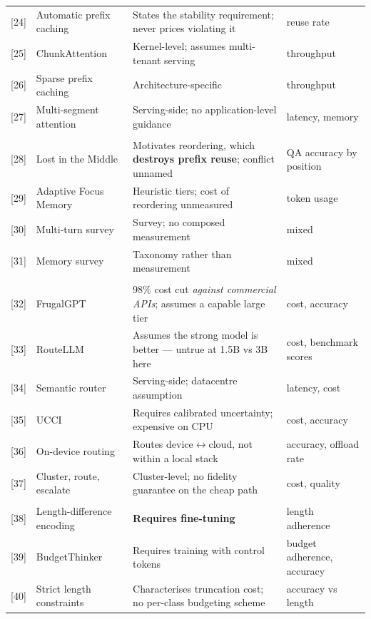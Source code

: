 \documentclass[11pt,a4paper]{article}
\begin{document}
\begin{table}[htbp]
\begin{tabularx}{\textwidth}{@{}l L{3.0cm} X l@{}}
{[24]} & Automatic prefix caching & States the stability requirement; never prices violating it & reuse rate \\
{[25]} & ChunkAttention & Kernel-level; assumes multi-tenant serving & throughput \\
{[26]} & Sparse prefix caching & Architecture-specific & throughput \\
{[27]} & Multi-segment attention & Serving-side; no application-level guidance & latency, memory \\
\addlinespace
{}\\
{[28]} & Lost in the Middle & Motivates reordering, which \textbf{destroys prefix reuse}; conflict unnamed & QA accuracy by position \\
{[29]} & Adaptive Focus Memory & Heuristic tiers; cost of reordering unmeasured & token usage \\
{[30]} & Multi-turn survey & Survey; no composed measurement & mixed \\
{[31]} & Memory survey & Taxonomy rather than measurement & mixed \\
\addlinespace
{}\\
{[32]} & FrugalGPT & 98\% cost cut \emph{against commercial APIs}; assumes a capable large tier & cost, accuracy \\
{[33]} & RouteLLM & Assumes the strong model is better --- untrue at 1.5B vs 3B here & cost, benchmark scores \\
{[34]} & Semantic router & Serving-side; datacentre assumption & latency, cost \\
{[35]} & UCCI & Requires calibrated uncertainty; expensive on CPU & cost, accuracy \\
{[36]} & On-device routing & Routes device$\leftrightarrow$cloud, not within a local stack & accuracy, offload rate \\
{[37]} & Cluster, route, escalate & Cluster-level; no fidelity guarantee on the cheap path & cost, quality \\
\addlinespace
{}\\
{[38]} & Length-difference encoding & \textbf{Requires fine-tuning} & length adherence \\
{[39]} & BudgetThinker & Requires training with control tokens & budget adherence, accuracy \\
{[40]} & Strict length constraints & Characterises truncation cost; no per-class budgeting scheme & accuracy vs length \\
\bottomrule
\end{tabularx}
\end{table}
\end{document}
